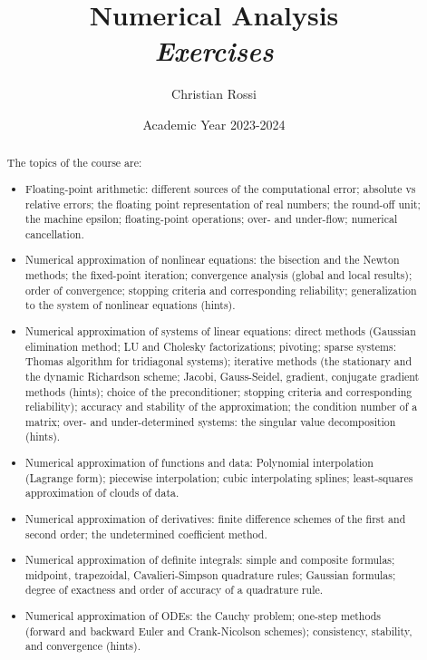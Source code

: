 \documentclass[12pt, a4paper]{report}
\title{Numerical Analysis\\ \textit{Exercises}}
\author{Christian Rossi}
\date{Academic Year 2023-2024}
\newtheorem[style=M,bodystyle=\normalfont]{theorem}{Theorem}
\newtheorem[style=M,bodystyle=\normalfont]{corollary}{Corollary}
\newtheorem[style=M,bodystyle=\normalfont]{lemma}{Lemma}
\newtheorem[style=M,bodystyle=\normalfont]{definition}{Definition}
\begin{document}
\maketitle

\newpage

\begin{abstract}
    The topics of the course are:
    \begin{itemize}
        \item Floating-point arithmetic: different sources of the computational error; absolute vs relative errors; the floating point representation 
            of real numbers; the round-off unit; the machine epsilon; floating-point operations; over- and under-flow; numerical cancellation.
        \item Numerical approximation of nonlinear equations: the bisection and the Newton methods; the fixed-point iteration; convergence analysis 
            (global and local results); order of convergence; stopping criteria and corresponding reliability; generalization to the system of 
            nonlinear equations (hints).
        \item Numerical approximation of systems of linear equations: direct methods (Gaussian elimination method; LU and Cholesky factorizations; 
            pivoting; sparse systems: Thomas algorithm for tridiagonal systems); iterative methods (the stationary and the dynamic Richardson scheme; 
            Jacobi, Gauss-Seidel, gradient, conjugate gradient methods (hints); choice of the preconditioner; stopping criteria and corresponding 
            reliability); accuracy and stability of the approximation; the condition number of a matrix; over- and under-determined systems: the 
            singular value decomposition (hints).
        \item Numerical approximation of functions and data: Polynomial interpolation (Lagrange form); piecewise interpolation; cubic interpolating 
            splines; least-squares approximation of clouds of data.
        \item Numerical approximation of derivatives: finite difference schemes of the first and second order; the undetermined coefficient method.
        \item Numerical approximation of definite integrals: simple and composite formulas; midpoint, trapezoidal, Cavalieri-Simpson quadrature rules; 
            Gaussian formulas; degree of exactness and order of accuracy of a quadrature rule. 
        \item Numerical approximation of ODEs: the Cauchy problem; one-step methods (forward and backward Euler and Crank-Nicolson schemes); 
            consistency, stability, and convergence (hints).
    \end{itemize}
\end{abstract}
\end{document}
